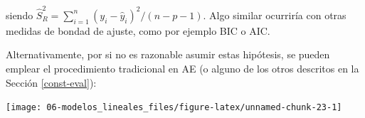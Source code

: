 \documentclass[
  spanish,
]{book}
\newenvironment{Shaded}{\begin{snugshade}}{\end{snugshade}}
\newcommand{\AttributeTok}[1]{\textcolor[rgb]{0.77,0.63,0.00}{#1}}
\newcommand{\CommentTok}[1]{\textcolor[rgb]{0.56,0.35,0.01}{\textit{#1}}}
\newcommand{\DecValTok}[1]{\textcolor[rgb]{0.00,0.00,0.81}{#1}}
\newcommand{\FunctionTok}[1]{\textcolor[rgb]{0.00,0.00,0.00}{#1}}
\newcommand{\NormalTok}[1]{#1}
\newcommand{\OtherTok}[1]{\textcolor[rgb]{0.56,0.35,0.01}{#1}}
\newcommand{\SpecialCharTok}[1]{\textcolor[rgb]{0.00,0.00,0.00}{#1}}
\newcommand{\StringTok}[1]{\textcolor[rgb]{0.31,0.60,0.02}{#1}}
\theoremstyle{break}
\theoremstyle{definition}
\theoremstyle{definition}
\theoremstyle{definition}
\theoremstyle{definition}
\theoremstyle{remark}
\begin{document}
siendo \(\hat{S}_{R}^{2}=\sum_{i=1}^{n}(y_{i}-\hat{y}_{i})^{2}/(n - p - 1)\).
Algo similar ocurriría con otras medidas de bondad de ajuste, como por ejemplo BIC o AIC.

Alternativamente, por si no es razonable asumir estas hipótesis, se pueden emplear el procedimiento tradicional en AE (o alguno de los otros descritos en la Sección \ref{const-eval}):

\begin{Shaded}
\end{Shaded}

\begin{center}\texttt{[image: 06-modelos\_lineales\_files/figure-latex/unnamed-chunk-23-1]} \end{center}
\end{document}
